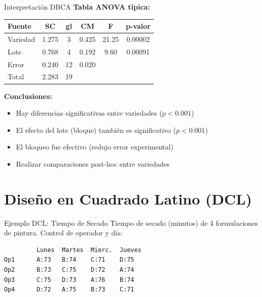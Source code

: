\documentclass[aspectratio=169]{beamer}
\begin{document}
\begin{frame}{Interpretación DBCA}
\textbf{Tabla ANOVA típica:}

\begin{table}
\small
\begin{tabular}{lccccc}
\toprule
\textbf{Fuente} & \textbf{SC} & \textbf{gl} & \textbf{CM} & \textbf{F} & \textbf{p-valor} \\
\midrule
Variedad & 1.275 & 3 & 0.425 & 21.25 & 0.00002 \\
Lote & 0.768 & 4 & 0.192 & 9.60 & 0.00091 \\
Error & 0.240 & 12 & 0.020 & & \\
\midrule
Total & 2.283 & 19 & & & \\
\bottomrule
\end{tabular}
\end{table}

\vspace{0.3cm}

\textbf{Conclusiones:}
\begin{itemize}
\item Hay diferencias significativas entre variedades ($p < 0.001$)
\item El efecto del lote (bloque) también es significativo ($p < 0.001$)
\item El bloqueo fue efectivo (redujo error experimental)
\item Realizar comparaciones post-hoc entre variedades
\end{itemize}
\end{frame}

\section{Diseño en Cuadrado Latino (DCL)}

\begin{frame}[fragile]{Ejemplo DCL: Tiempo de Secado}
\small
Tiempo de secado (minutos) de 4 formulaciones de pintura. Control de operador y día:

\begin{verbatim}
         Lunes  Martes  Mierc.  Jueves
Op1      A:73   B:74    C:71    D:75
Op2      B:73   C:75    D:72    A:74
Op3      C:75   D:73    A:76    B:74
Op4      D:72   A:75    B:73    C:71
\end{verbatim}
\end{frame}
\end{document}
